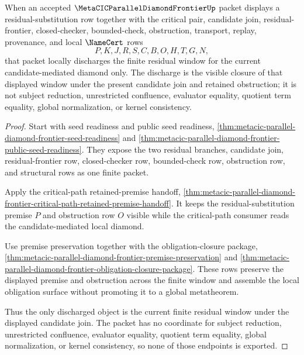 \begin{theorem}
\label{thm:metacic-parallel-diamond-frontier-residual-substitution-local-discharge}
When an accepted $\MetaCICParallelDiamondFrontierUp$ packet displays a residual-substitution row together with the critical pair, candidate join, residual-frontier, closed-checker, bounded-check, obstruction, transport, replay, provenance, and local $\NameCert$ rows
$$
P,K,J,R,S,C,B,O,H,T,G,N,
$$
that packet locally discharges the finite residual window for the current candidate-mediated diamond only. The discharge is the visible closure of that displayed window under the present candidate join and retained obstruction; it is not subject reduction, unrestricted confluence, evaluator equality, quotient term equality, global normalization, or kernel consistency.
\end{theorem}
\begin{proof}
Start with seed readiness and public seed readiness, \autoref{thm:metacic-parallel-diamond-frontier-seed-readiness} and \autoref{thm:metacic-parallel-diamond-frontier-public-seed-readiness}. They expose the two residual branches, candidate join, residual-frontier row, closed-checker row, bounded-check row, obstruction row, and structural rows as one finite packet.

Apply the critical-path retained-premise handoff, \autoref{thm:metacic-parallel-diamond-frontier-critical-path-retained-premise-handoff}. It keeps the residual-substitution premise $P$ and obstruction row $O$ visible while the critical-path consumer reads the candidate-mediated local diamond.

Use premise preservation together with the obligation-closure package, \autoref{thm:metacic-parallel-diamond-frontier-premise-preservation} and \autoref{thm:metacic-parallel-diamond-frontier-obligation-closure-package}. These rows preserve the displayed premise and obstruction across the finite window and assemble the local obligation surface without promoting it to a global metatheorem.

Thus the only discharged object is the current finite residual window under the displayed candidate join. The packet has no coordinate for subject reduction, unrestricted confluence, evaluator equality, quotient term equality, global normalization, or kernel consistency, so none of those endpoints is exported.
\end{proof}

